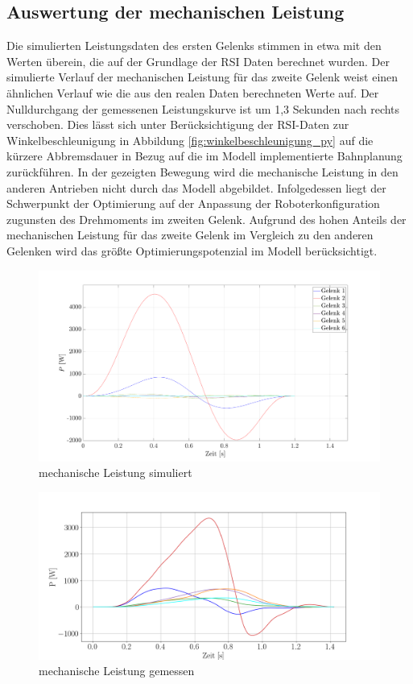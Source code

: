 \subsection{Auswertung der mechanischen Leistung}
Die simulierten Leistungsdaten des ersten Gelenks stimmen in etwa mit den Werten überein, die auf der Grundlage der RSI Daten berechnet wurden. Der simulierte Verlauf der mechanischen Leistung für das zweite Gelenk weist einen ähnlichen Verlauf wie die aus den realen Daten berechneten Werte auf. Der Nulldurchgang der gemessenen Leistungskurve ist um 1,3 Sekunden nach rechts verschoben.  Dies lässt sich unter Berücksichtigung der RSI-Daten zur Winkelbeschleunigung in Abbildung \ref{fig:winkelbeschleunigung_py} auf die kürzere Abbremsdauer in Bezug auf die im Modell implementierte Bahnplanung  zurückführen. In der gezeigten Bewegung wird die mechanische Leistung in den anderen Antrieben nicht durch das Modell abgebildet. Infolgedessen liegt der Schwerpunkt der Optimierung auf der Anpassung der Roboterkonfiguration zugunsten des Drehmoments im zweiten Gelenk. Aufgrund des hohen Anteils der mechanischen Leistung für das zweite Gelenk im Vergleich zu den anderen Gelenken wird das größte Optimierungspotenzial im Modell berücksichtigt. 
%
\begin{figure}[tbph]
	\centering
	\includegraphics[width=1\linewidth]{images/pmat}
	\caption{mechanische Leistung simuliert}
	\label{fig:pmat}
\end{figure}
%
\begin{figure}[tbph]
	\centering
	\includegraphics[width=1\linewidth]{images/p}
	\caption{mechanische Leistung gemessen}
	\label{fig:p}
\end{figure}
%
